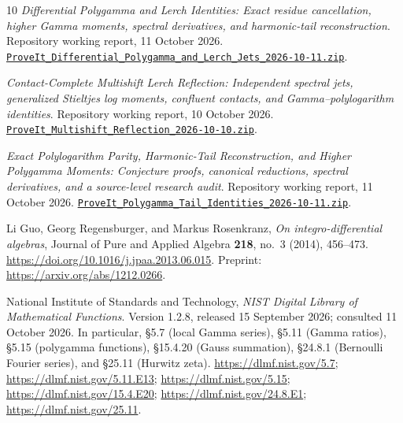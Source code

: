 \begin{thebibliography}{10}
\emph{Differential Polygamma and Lerch Identities: Exact residue
cancellation, higher Gamma moments, spectral derivatives, and
harmonic-tail reconstruction}.
Repository working report, 11 October 2026.
\href{https://raw.githubusercontent.com/VladimirReshetnikov/ProveIt/446dca9bd65c20e409d1d2561d4ffad408103e2a/docs/incoming/ProveIt_Differential_Polygamma_and_Lerch_Jets_2026-10-11.zip}
{\nolinkurl{ProveIt_Differential_Polygamma_and_Lerch_Jets_2026-10-11.zip}}.

\emph{Contact-Complete Multishift Lerch Reflection: Independent
spectral jets, generalized Stieltjes log moments, confluent contacts,
and Gamma--polylogarithm identities}.
Repository working report, 10 October 2026.
\href{https://raw.githubusercontent.com/VladimirReshetnikov/ProveIt/446dca9bd65c20e409d1d2561d4ffad408103e2a/docs/incoming/ProveIt_Multishift_Reflection_2026-10-10.zip}
{\nolinkurl{ProveIt_Multishift_Reflection_2026-10-10.zip}}.

\emph{Exact Polylogarithm Parity, Harmonic-Tail Reconstruction,
and Higher Polygamma Moments: Conjecture proofs, canonical reductions,
spectral derivatives, and a source-level research audit}.
Repository working report, 11 October 2026.
\href{https://raw.githubusercontent.com/VladimirReshetnikov/ProveIt/446dca9bd65c20e409d1d2561d4ffad408103e2a/docs/incoming/ProveIt_Polygamma_Tail_Identities_2026-10-11.zip}
{\nolinkurl{ProveIt_Polygamma_Tail_Identities_2026-10-11.zip}}.

Li Guo, Georg Regensburger, and Markus Rosenkranz,
\emph{On integro-differential algebras},
Journal of Pure and Applied Algebra \textbf{218}, no.~3 (2014),
456--473.
\url{https://doi.org/10.1016/j.jpaa.2013.06.015}.
Preprint: \url{https://arxiv.org/abs/1212.0266}.

National Institute of Standards and Technology,
\emph{NIST Digital Library of Mathematical Functions}.
Version 1.2.8, released 15 September 2026; consulted 11 October 2026.
In particular, \S5.7 (local Gamma series), \S5.11 (Gamma ratios),
\S5.15 (polygamma functions), \S15.4.20 (Gauss summation),
\S24.8.1 (Bernoulli Fourier series), and \S25.11 (Hurwitz zeta).
\url{https://dlmf.nist.gov/5.7};
\url{https://dlmf.nist.gov/5.11.E13};
\url{https://dlmf.nist.gov/5.15};
\url{https://dlmf.nist.gov/15.4.E20};
\url{https://dlmf.nist.gov/24.8.E1};
\url{https://dlmf.nist.gov/25.11}.

\end{thebibliography}
